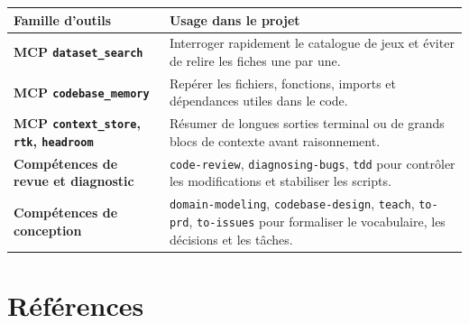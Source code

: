 \documentclass[11pt,a4paper]{article}
\begin{document}
\begin{center}
\small
\begin{tabularx}{\textwidth}{>{\bfseries}p{3.5cm}X}
\toprule
Famille d'outils & Usage dans le projet \\
\midrule
MCP \texttt{dataset\_search} & Interroger rapidement le catalogue de jeux et éviter de relire les fiches une par une. \\
MCP \texttt{codebase\_memory} & Repérer les fichiers, fonctions, imports et dépendances utiles dans le code. \\
MCP \texttt{context\_store}, \texttt{rtk}, \texttt{headroom} & Résumer de longues sorties terminal ou de grands blocs de contexte avant raisonnement. \\
Compétences de revue et diagnostic & \texttt{code-review}, \texttt{diagnosing-bugs}, \texttt{tdd} pour contrôler les modifications et stabiliser les scripts. \\
Compétences de conception & \texttt{domain-modeling}, \texttt{codebase-design}, \texttt{teach}, \texttt{to-prd}, \texttt{to-issues} pour formaliser le vocabulaire, les décisions et les tâches. \\
\bottomrule
\end{tabularx}
\end{center}


\clearpage


\section*{Références}
\end{document}
